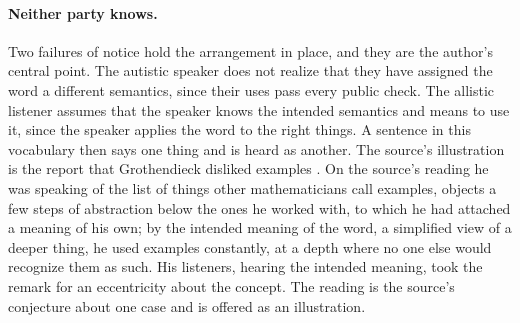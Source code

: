 \paragraph{Neither party knows.} Two failures of notice hold the arrangement in place, and they are the author's central point. The autistic speaker does not realize that they have assigned the word a different semantics, since their uses pass every public check. The allistic listener assumes that the speaker knows the intended semantics and means to use it, since the speaker applies the word to the right things. A sentence in this vocabulary then says one thing and is heard as another. The source's illustration is the report that Grothendieck disliked examples \cite{Jackson2004}. On the source's reading he was speaking of the list of things other mathematicians call examples, objects a few steps of abstraction below the ones he worked with, to which he had attached a meaning of his own; by the intended meaning of the word, a simplified view of a deeper thing, he used examples constantly, at a depth where no one else would recognize them as such. His listeners, hearing the intended meaning, took the remark for an eccentricity about the concept. The reading is the source's conjecture about one case and is offered as an illustration.

